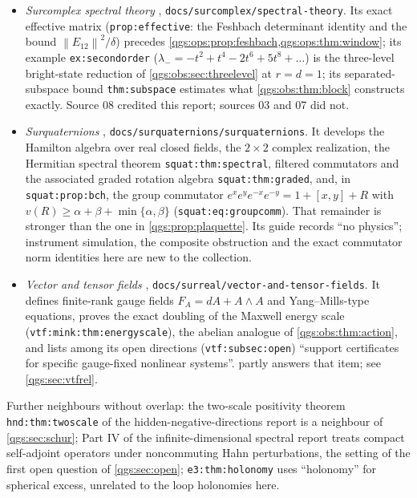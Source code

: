 \documentclass[11pt,oneside]{article}
\numberwithin{equation}{section}
\theoremstyle{plain}
\theoremstyle{definition}
\theoremstyle{remark}
\newcommand{\norm}[1]{\left\|#1\right\|}
\begin{document}
\begin{itemize}
\item \emph{Surcomplex spectral theory} \cite{repoSpectral}, \texttt{docs/surcomplex/spectral-theory}. Its exact effective matrix (\texttt{prop:effective}: the Feshbach determinant identity and the bound $\norm{E_{12}}^2/\delta$) precedes \cref{qgs:ops:prop:feshbach,qgs:ops:thm:window}; its example \texttt{ex:secondorder} ($\lambda_-=-t^2+t^4-2t^6+5t^8+\dots$) is the three-level bright-state reduction of \cref{qgs:obs:sec:threelevel} at $r=d=1$; its separated-subspace bound \texttt{thm:subspace} estimates what \cref{qgs:obs:thm:block} constructs exactly. Source 08 credited this report; sources 03 and 07 did not.
\item \emph{Surquaternions} \cite{repoQuaternion}, \texttt{docs/surquaternions/surquaternions}. It develops the Hamilton algebra over real closed fields, the $2\times2$ complex realization, the Hermitian spectral theorem \texttt{squat:thm:spectral}, filtered commutators and the associated graded rotation algebra \texttt{squat:thm:graded}, and, in \texttt{squat:prop:bch}, the group commutator $e^xe^ye^{-x}e^{-y}=1+[x,y]+R$ with $v(R)\ge\alpha+\beta+\min\{\alpha,\beta\}$ (\texttt{squat:eq:groupcomm}). That remainder is stronger than the one in \cref{qgs:prop:plaquette}. Its guide records ``no physics''; instrument simulation, the composite obstruction and the exact commutator norm identities here are new to the collection.
\item \emph{Vector and tensor fields} \cite{repoVTF}, \texttt{docs/surreal/vector-and-tensor-fields}. It defines finite-rank gauge fields $F_A=dA+A\wedge A$ and Yang--Mills-type equations, proves the exact doubling of the Maxwell energy scale (\texttt{vtf:mink:thm:energyscale}), the abelian analogue of \cref{qgs:obs:thm:action}, and lists among its open directions (\texttt{vtf:subsec:open}) ``support certificates for specific gauge-fixed nonlinear systems''.  partly answers that item; see \cref{qgs:sec:vtfrel}.
\end{itemize}
Further neighbours without overlap: the two-scale positivity theorem \texttt{hnd:thm:twoscale} of the hidden-negative-directions report is a neighbour of \cref{qgs:sec:schur}; Part IV of the infinite-dimensional spectral report treats compact self-adjoint operators under noncommuting Hahn perturbations, the setting of the first open question of \cref{qgs:sec:open}; \texttt{e3:thm:holonomy} uses ``holonomy'' for spherical excess, unrelated to the loop holonomies here.
\end{document}
